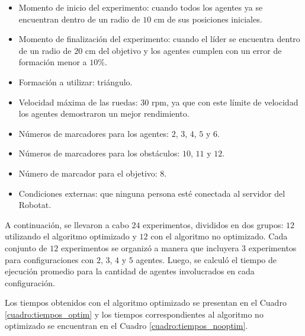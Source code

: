 \begin{itemize}
	\item Momento de inicio del experimento: cuando todos los agentes ya se encuentran dentro de un radio de $10$ cm de sus posiciones iniciales.
	\item  Momento de finalización del experimento: cuando el líder se encuentra dentro de un radio de $20$ cm del objetivo y los agentes cumplen con un error de formación menor a $10\%$. 
	\item Formación a utilizar: triángulo.
	\item Velocidad máxima de las ruedas: $30$ rpm, ya que con este límite de velocidad los agentes demostraron un mejor rendimiento.
	\item Números de marcadores para los agentes: $2$, $3$, $4$, $5$ y $6$.
	\item Números de marcadores para los obstáculos: $10$, $11$ y $12$.
	\item Número de marcador para el objetivo: $8$.
	\item Condiciones externas: que ninguna persona esté conectada al servidor del Robotat.
\end{itemize}

A continuación, se llevaron a cabo $24$ experimentos, divididos en dos grupos: $12$ utilizando el algoritmo optimizado y $12$ con el algoritmo no optimizado. Cada conjunto de $12$ experimentos se organizó a manera que incluyera $3$ experimentos para configuraciones con $2$, $3$, $4$ y $5$ agentes. Luego, se calculó el tiempo de ejecución promedio para la cantidad de agentes involucrados en cada configuración.

Los tiempos obtenidos con el algoritmo optimizado se presentan en el Cuadro \ref{cuadro:tiempos_optim} y los tiempos correspondientes al algoritmo no optimizado se encuentran en el Cuadro \ref{cuadro:tiempos_nooptim}.

